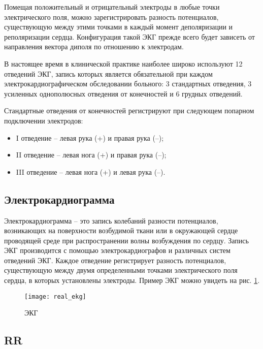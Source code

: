 Помещая положительный и отрицательный электроды в любые точки электрического поля, можно зарегистрировать разность потенциалов, существующую между этими точками в каждый момент деполяризации и реполяризации сердца. Конфигурация такой ЭКГ прежде всего будет зависеть от направления вектора диполя по отношению к электродам.

В настоящее время в клинической практике наиболее широко используют 12 отведений ЭКГ, запись которых является обязательной при каждом электрокардиографическом обследовании больного: 3 стандартных отведения, 3 усиленных однополюсных отведения от конечностей и 6 грудных отведений.

Стандартные отведения от конечностей регистрируют при следующем попарном подключении электродов:

\begin{itemize}
	\item I отведение – левая рука (+) и правая рука (–);
	\item II отведение – левая нога (+) и правая рука (–);
	\item III отведение – левая нога (+) и левая рука (–).
\end{itemize}

\subsection{Электрокардиограмма}



Электрокардиограмма – это запись колебаний разности потенциалов, возникающих на поверхности возбудимой ткани или в окружающей сердце проводящей среде при распространении волны возбуждения по сердцу.\cite{ekg1} Запись ЭКГ производится с помощью электрокардиографов и различных систем отведений ЭКГ. Каждое отведение регистрирует разность потенциалов, существующую между двумя определенными точками электрического поля сердца, в которых установлены электроды. Пример ЭКГ можно увидеть на рис. \ref{ris:RR}.

\begin{figure}[h!]
	\begin{center}
		\texttt{[image: real\_ekg]}
		\caption{ЭКГ}
		\label{ris:RR}
	\end{center}
\end{figure}

\subsection{RR}

